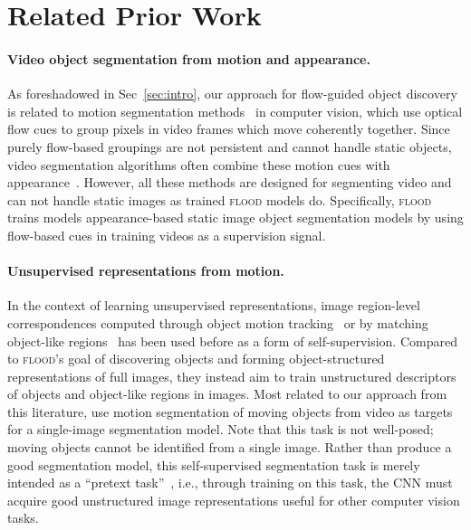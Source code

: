 \documentclass{article}
\begin{document}
\section{Related Prior Work}
\label{sec:related_work}



\paragraph{Video object segmentation from motion and appearance.} As foreshadowed in Sec~\ref{sec:intro}, our approach for flow-guided object discovery is related to motion segmentation methods~\cite{shi1998motion,tron2007benchmark,yan2006general,tokmakov2017learning,keuper2018motion,bideau2018moa, yang2021rigidmask} in computer vision, which use optical flow cues to group pixels in video frames which move coherently together. Since purely flow-based groupings are not persistent and cannot handle static objects, video segmentation algorithms often combine these motion cues with appearance~\cite{weiss1995perceptually, jain2017fusionseg, tokmakov2017learning, cheng2017segflow}. However, all these methods are designed for segmenting video and can not handle static images as trained \textsc{flood} models do. Specifically, \textsc{flood} trains models appearance-based static image object segmentation models by using flow-based cues in training videos as a supervision signal.


\paragraph{Unsupervised representations from motion.} In the context of learning unsupervised representations, image region-level correspondences computed through object motion tracking~\cite{wang2015unsupervised} or by matching object-like regions~\cite{gao2016object} has been used before as a form of self-supervision. Compared to \textsc{flood}'s goal of discovering objects and forming object-structured representations of full images, they instead aim to train unstructured descriptors of objects and object-like regions in images. Most related to our approach from this literature, \citet{pathak2017learning} use motion segmentation of moving objects from video as targets for a single-image segmentation model. Note that this task is not well-posed; moving objects cannot be identified from a single image. Rather than produce a good segmentation model, this self-supervised segmentation task is merely intended as a ``pretext task''~\cite{pathak2017learning}, i.e., through training on this task, the CNN must acquire good unstructured image representations useful for other computer vision tasks.
\end{document}
